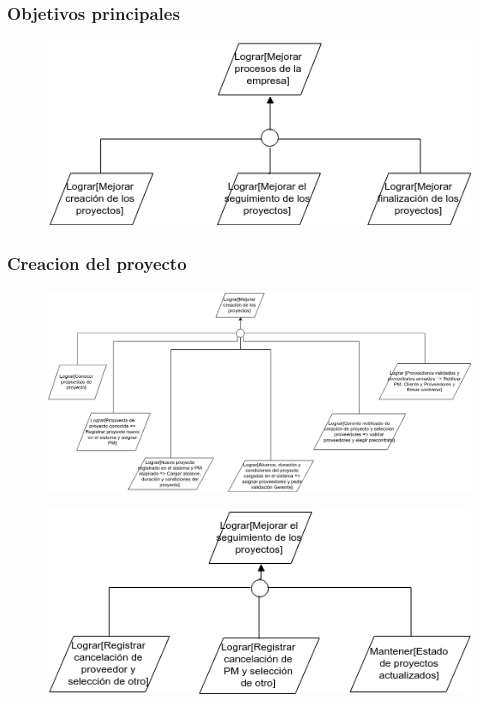 \subsubsection{Objetivos principales}

\begin{figure}[H]
    \centering
    \includegraphics[width=\textwidth]{imagenes/objetivos-principales.png}
\end{figure}

\subsubsection{Creacion del proyecto}

\begin{figure}[H]
    \centering
    \includegraphics[width=\textwidth, keepaspectratio, angle=90]{imagenes/objetivos-creacion.png}
\end{figure}

\vspace{1em}

\begin{figure}[H]
    \centering
    \includegraphics[width=\textwidth]{imagenes/objetivos-seguimiento.png}
\end{figure}

